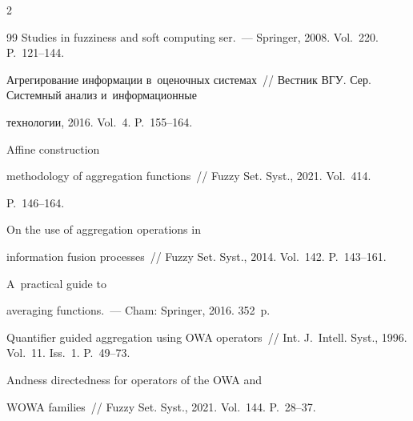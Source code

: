 \begin{multicols}{2}
{{\begin{thebibliography}{99}
 Studies in fuzziness and soft computing ser.~--- Springer, 2008. Vol.~220. P.~121--144.







 Агрегирование информации в~оценочных системах~// Вестник ВГУ. Сер. Сис\-тем\-ный анализ и~информационные 


технологии, 2016. Vol.~4. P.~155--164.







 Affine construction 


methodology of aggregation functions~// Fuzzy Set. Syst., 2021. Vol.~414. 


P.~146--164.







 On the use of aggregation operations in 


information fusion processes~// Fuzzy Set. Syst., 2014. Vol.~142. P.~143--161.







 A~practical guide to 


averaging functions.~--- Cham: Springer, 2016. 352~p.







 Quantifier guided aggregation using OWA operators~// Int. J.~Intell. Syst., 1996. Vol.~11. Iss.~1. P.~49--73.







 Andness directedness for operators of the OWA and 


WOWA families~// Fuzzy Set. Syst., 2021. Vol.~144. P.~28--37.












\end{thebibliography}}}
\end{multicols}
